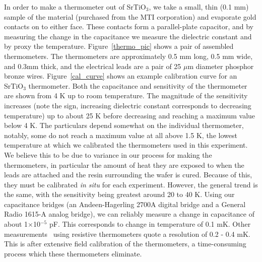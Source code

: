 \documentclass{thesis-umich}
\begin{document}
In order to make a thermometer out of SrTiO$_3$, we take a small, thin (0.1 mm)
sample of the material (purchased from the MTI corporation)\cite{MTICorp} and
evaporate gold contacts on to either face.  These contacts form a parallel-plate
capacitor, and by measuring the change in the capacitance we measure the
dielectric constant and by proxy the temperature.  Figure~\ref{thermo_pic} shows
a pair of assembled thermometers.  The thermometers are approximately 0.5 mm
long, 0.5 mm wide, and 0.3mm thick, and the electrical leads are a pair of 25
$\mu$m diameter phosphor bronze wires.  Figure~\ref{cal_curve} shows an example
calibration curve for an SrTiO$_3$ thermometer. Both the capacitance and
sensitivity of the thermometer are shown from 4 K up to room temperature. The
magnitude of the sensitivity increases (note the sign, increasing dielectric
constant corresponds to decreasing temperature) up to about 25 K before
decreasing and reaching a maximum value below 4 K. The particulars depend
somewhat on the individual thermometer, notably, some do not reach a maximum
value at all above 1.5 K, the lowest temperature at which we calibrated the
thermometers used in this experiment. We believe this to be due to variance in
our process for making the thermometers, in particular the amount of heat they
are exposed to when the leads are attached and the resin surrounding the wafer
is cured. Because of this, they must be calibrated \textit{in situ} for each
experiment.  However, the general trend is the same, with the sensitivity being
greatest around 20 to 40 K. Using our capacitance bridges (an Andeen-Hagerling
2700A digital bridge and a General Radio 1615-A analog bridge), we can reliably
measure a change in capacitance of about 1$\times$10$^{-5}$ pF. This corresponds
to change in temperature of 0.1 mK. Other measurements~\cite{Hirschberger2015}
using resistive thermometers quote a resolution of 0.2 - 0.4 mK. This is after
extensive field calibration of the thermometers, a time-consuming process which
these thermometers eliminate.
\end{document}
